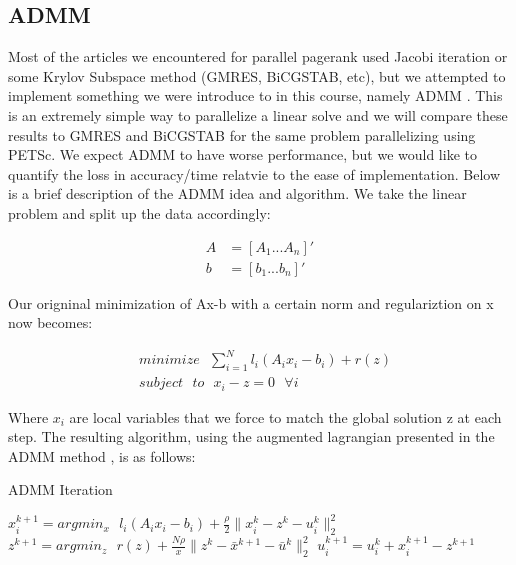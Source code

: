 \documentclass[a4paper,10pt]{article}
\begin{document}
\subsection{ADMM}

Most of the articles we encountered for parallel pagerank used Jacobi iteration or some Krylov Subspace method (GMRES, BiCGSTAB, etc), but we attempted to implement something we were introduce to in this course, namely ADMM \cite{ADMM}. This is an extremely simple way to parallelize a linear solve and we will compare these results to GMRES and BiCGSTAB for the same problem parallelizing using PETSc. We expect ADMM to have worse performance, but we would like to quantify the loss in accuracy/time relatvie to the ease of implementation.
\newline
\linebreak
Below is a brief description of the ADMM idea and algorithm.
\newline
We take the linear problem and split up the data accordingly:
\begin{center}
\begin{align}
	A &= \left[ A_{1} ... A_{n} \right]' \\
	b &= \left[ b_{1} ... b_{n} \right]' 
\end{align}
\end{center}
Our origninal minimization of Ax-b with a certain norm and regulariztion on x now becomes:

\begin{center}
\begin{align}
	&minimize \: \: \: \sum_{i=1}^{N} l_{i}(A_{i}x_{i} - b_{i}) + r(z) \\
	&subject \: \: \: to \: \: \: x_{i} - z = 0 \: \: \: \forall i
\end{align}
\end{center}
Where $x_{i}$ are local variables that we force to match the global solution z at each step.
\newline
The resulting algorithm, using the augmented lagrangian presented in the ADMM method \cite{ADMM}, is as follows:

\begin{center}
\begin{algorithm}
\caption{ADMM Iteration}
\begin{algorithmic}[1]
	\STATE $x_{i}^{k+1} = argmin_{x} \: \: \: l_{i}(A_{i}x_{i} - b_{i}) + \frac{\rho}{2} \| x_{i}^{k} - z^{k} - u_{i}^{k} \|_{2}^{2}$ 
	\STATE $z^{k+1} = argmin_{z} \: \: \: r(z) + \frac{N \rho}{x} \| z^{k} - \bar{x}^{k+1} - \bar{u}^{k} \|_{2}^{2} $
	\STATE $u_{i}^{k+1} = u_{i}^{k} + x_{i}^{k+1} - z^{k+1} $ 
  \end{algorithmic}
\end{algorithm}
\end{center}
\end{document}
